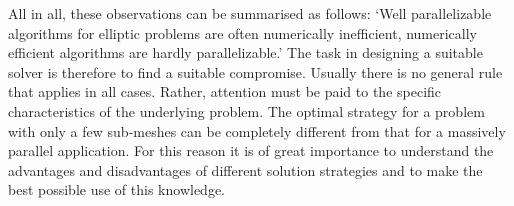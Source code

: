 All in all, these observations can be summarised as follows:
`Well parallelizable algorithms for elliptic problems are often numerically inefficient, numerically efficient algorithms are hardly parallelizable.' The task in designing a suitable solver is therefore to find a suitable compromise. Usually there is no general rule that applies in all cases. Rather, attention must be paid to the specific characteristics of the underlying problem. The optimal strategy for a problem with only a few sub-meshes can be completely different from that for a massively parallel application. For this reason it is of great importance to understand the advantages and disadvantages of different solution strategies and to make the best possible use of this knowledge.


